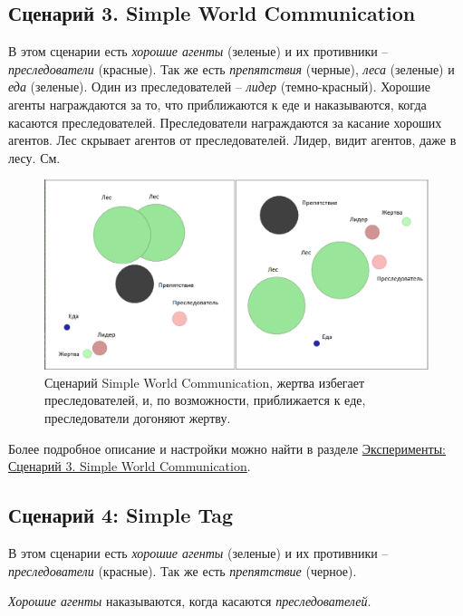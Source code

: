 \subsection{Сценарий 3. Simple World Communication} \label{intro-swc}

В этом сценарии есть \textit{хорошие агенты} (зеленые) и их противники – \textit{преследователи} (красные). Так же есть \textit{препятствия} (черные), \textit{леса} (зеленые) и \textit{еда} (зеленые). Один из преследователей – \textit{лидер} (темно-красный).
Хорошие агенты награждаются за то, что приближаются к еде и наказываются, когда касаются преследователей.
Преследователи награждаются за касание хороших агентов.
Лес скрывает агентов от преследователей. Лидер, видит агентов, даже в лесу. См. 

\begin{figure}[ht!] 
	\center
	\includegraphics [scale=0.41] {my_folder/images/swc.png}
	\caption{Сценарий Simple World Communication, жертва избегает преследователей, и, по возможности, приближается к еде, преследователи догоняют жертву.}
	\label{fig:swc}  
\end{figure}

Более подробное описание и настройки можно найти в разделе \hyperref[exp-swc]{Эксперименты: Сценарий 3. Simple World Communication}.

\subsection{Сценарий 4: Simple Tag} \label{intro-st}

В этом сценарии есть \textit{хорошие агенты} (зеленые) и их противники – \textit{преследователи} (красные). Так же есть \textit{препятствие} (черное).

\textit{Хорошие агенты} наказываются, когда касаются \textit{преследователей}.

